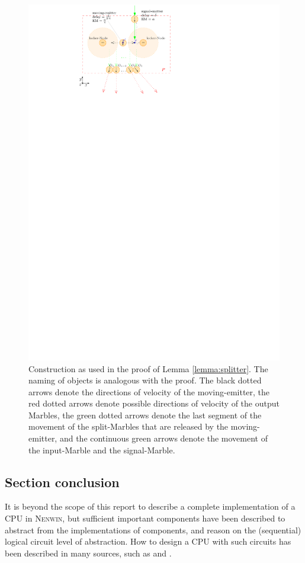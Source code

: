 \begin{figure}[h]
    \centering
    \includegraphics{figures/splitter_v4.pdf}
    \caption{Construction as used in the proof of Lemma \ref{lemma:splitter}. The naming of objects is analogous with the proof. The black dotted arrows denote the directions of velocity of the moving-emitter, the red dotted arrows denote possible directions of velocity of the output Marbles, the green dotted arrows denote the last segment of the movement of the split-Marbles that are released by the moving-emitter, and the continuous green arrows denote the movement of the input-Marble and the signal-Marble.}
    \label{fig:splitter}
\end{figure}



\subsection{Section conclusion}
It is beyond the scope of this report to describe a complete implementation of a CPU in \textsc{Nenwin}, but sufficient important components have been described to abstract from the implementations of components, and reason on the (sequential) logical circuit level of abstraction. How to design a CPU with such circuits has been described in many sources, such as \cite{comp_architecture} and \cite{comp_org_design}.

\clearpage